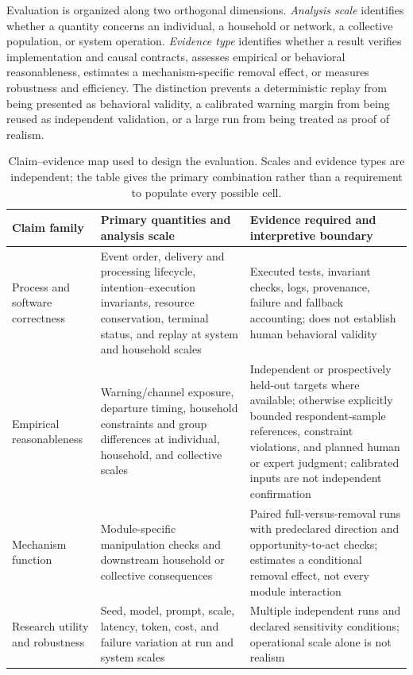 \documentclass[journal]{IEEEtran}
\begin{document}
Evaluation is organized along two orthogonal dimensions. \emph{Analysis scale}
identifies whether a quantity concerns an individual, a household or network,
a collective population, or system operation. \emph{Evidence type} identifies
whether a result verifies implementation and causal contracts, assesses
empirical or behavioral reasonableness, estimates a mechanism-specific removal
effect, or measures robustness and efficiency. The distinction prevents a
deterministic replay from being presented as behavioral validity, a calibrated
warning margin from being reused as independent validation, or a large run from
being treated as proof of realism.

\begin{table}[t]
\centering
\caption{Claim--evidence map used to design the evaluation. Scales and evidence
types are independent; the table gives the primary combination rather than a
requirement to populate every possible cell.}
\label{tab:evidence-map}
\begin{tabularx}{\textwidth}{@{}p{}Y Y@{}}
\toprule
Claim family & Primary quantities and analysis scale & Evidence required and
interpretive boundary \\
\midrule
Process and software correctness & Event order, delivery and processing
lifecycle, intention--execution invariants, resource conservation, terminal
status, and replay at system and household scales & Executed tests, invariant
checks, logs, provenance, failure and fallback accounting; does not establish
human behavioral validity \\
Empirical reasonableness & Warning/channel exposure, departure timing,
household constraints and group differences at individual, household, and
collective scales & Independent or prospectively held-out targets where
available; otherwise explicitly bounded respondent-sample references,
constraint violations, and planned human or expert judgment; calibrated inputs
are not independent confirmation \\
Mechanism function & Module-specific manipulation checks and downstream
household or collective consequences & Paired full-versus-removal runs with
predeclared direction and opportunity-to-act checks; estimates a conditional
removal effect, not every module interaction \\
Research utility and robustness & Seed, model, prompt, scale, latency, token,
cost, and failure variation at run and system scales & Multiple independent
runs and declared sensitivity conditions; operational scale alone is not
realism \\
\bottomrule
\end{tabularx}
\end{table}
\end{document}
